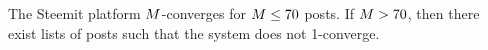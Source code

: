 \begin{corollary}
  The Steemit platform $M$-converges for $M \leq 70$ posts. If
  $M > 70$, then there exist lists of posts such that the system does not
  1-converge.
\end{corollary}

